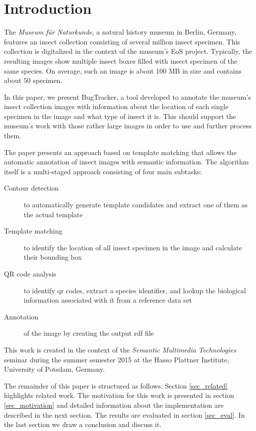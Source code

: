 \section{Introduction}
\label{sec_introduction}

The \emph{Museum für Naturkunde}, a natural history museum in Berlin, Germany, features an insect collection consisting of several million insect specimen.
This collection is digitalized in the context of the museum's EoS project.
Typically, the resulting images show multiple insect boxes  filled with insect specimen of the same species.
On average, such an image is about 100 MB in size and contains about 50 specimen.

In this paper, we present BugTracker, a tool developed to annotate the museum's insect collection images with information about the location of each single specimen in the image and what type of insect it is.
This should support the museum's work with those rather large images in order to use and further process them.

The paper presents an approach based on template matching that allows the automatic annotation of insect images with semantic information.
The algorithm itself is a multi-staged approach consisting of four main subtasks:

\begin{description}
    \item[Contour detection] to automatically generate template candidates and extract one of them as the actual template
    \item[Template matching] to identify the location of all insect specimen in the image and calculate their bounding box
    \item[QR code analysis] to identify qr codes, extract a species identifier, and lookup the biological information associated with it from a reference data set
    \item[Annotation] of the image by creating the output rdf file
\end{description}

This work is created in the context of the \emph{Semantic Multimedia Technologies} seminar during the summer semester 2015 at the Hasso Plattner Institute, University of Potsdam, Germany.

The remainder of this paper is structured as follows. 
Section \ref{sec_related} highlights related work.
The motivation for this work is presented in section \ref{sec_motivation} and detailed information about the implementation are described in the next section.
The results are evaluated in section \ref{sec_eval}.
In the last section we draw a conclusion and discuss it.
